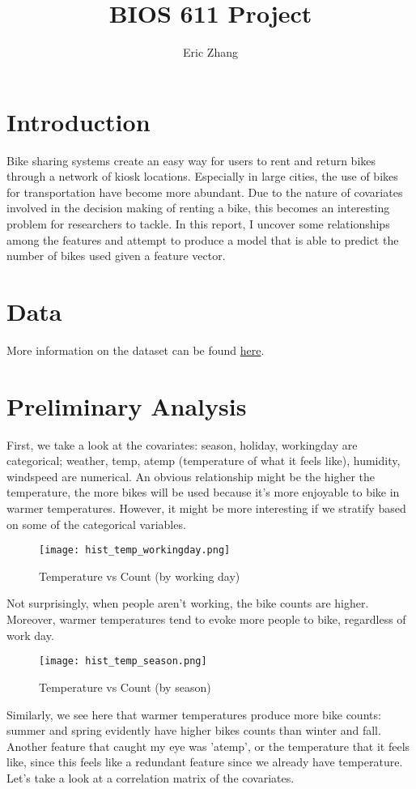 \documentclass{article}
\title{BIOS 611 Project}
\author{Eric Zhang }
\date{}
\begin{document}
\maketitle
\tableofcontents

\newpage
\section{Introduction}
Bike sharing systems create an easy way for users to rent and return bikes through a network of kiosk locations. Especially in large cities, the use of bikes for transportation have become more abundant. Due to the nature of covariates involved in the decision making of renting a bike, this becomes an interesting problem for researchers to tackle. In this report, I uncover some relationships among the features and attempt to produce a model that is able to predict the number of bikes used given a feature vector.

\section{Data}
More information on the dataset can be found \href{https://www.kaggle.com/c/bike-sharing-demand/data}{here}.

\section{Preliminary Analysis}
First, we take a look at the covariates: season, holiday, workingday are categorical; weather, temp, atemp (temperature of what it feels like), humidity, windspeed are numerical. An obvious relationship might be the higher the temperature, the more bikes will be used because it's more enjoyable to bike in warmer temperatures. However, it might be more interesting if we stratify based on some of the categorical variables.

\begin{figure}[htp]
    \centering
    \texttt{[image: hist\_temp\_workingday.png]}
    \caption{Temperature vs Count (by working day)}
    \label{fig:my_label}
\end{figure}
Not surprisingly, when people aren't working, the bike counts are higher. Moreover, warmer temperatures tend to evoke more people to bike, regardless of work day.

\begin{figure}[htp]
    \centering
    \texttt{[image: hist\_temp\_season.png]}
    \caption{Temperature vs Count (by  season)}
    \label{fig:my_label}
\end{figure}
Similarly, we see here that warmer temperatures produce more bike counts: summer and spring evidently have higher bikes counts than winter and fall. \\
\indent Another feature that caught my eye was 'atemp', or the temperature that it feels like, since this feels like a redundant feature since we already have temperature. Let's take a look at a correlation matrix of the covariates.
\end{document}
